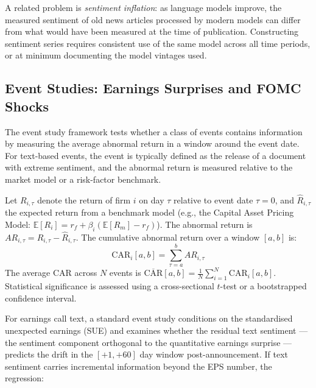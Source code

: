 A related problem is \emph{sentiment inflation}: as language models improve, the measured sentiment of old news articles processed by modern models can differ from what would have been measured at the time of publication. Constructing sentiment series requires consistent use of the same model across all time periods, or at minimum documenting the model vintages used.

\subsection{Event Studies: Earnings Surprises and FOMC Shocks}
\label{sec:ch09-event-studies}

The event study framework \cite{fama1970efficient} tests whether a class of events contains information by measuring the average abnormal return in a window around the event date. For text-based events, the event is typically defined as the release of a document with extreme sentiment, and the abnormal return is measured relative to the market model or a risk-factor benchmark.

\begin{definition}
\label{def:car}
Let $R_{i,\tau}$ denote the return of firm $i$ on day $\tau$ relative to event date $\tau=0$, and $\hat{R}_{i,\tau}$ the expected return from a benchmark model (e.g., the Capital Asset Pricing Model: $\mathbb{E}[R_i] = r_f + \beta_i(\mathbb{E}[R_m]-r_f)$). The abnormal return is $AR_{i,\tau} = R_{i,\tau} - \hat{R}_{i,\tau}$. The cumulative abnormal return over a window $[a,b]$ is:
\begin{equation}
  \label{eq:car}
  \mathrm{CAR}_{i}[a,b] = \sum_{\tau=a}^{b} AR_{i,\tau}
\end{equation}
The average CAR across $N$ events is $\overline{\mathrm{CAR}}[a,b] = \frac{1}{N} \sum_{i=1}^{N} \mathrm{CAR}_i[a,b]$. Statistical significance is assessed using a cross-sectional $t$-test or a bootstrapped confidence interval.
\end{definition}

For earnings call text, a standard event study conditions on the standardised unexpected earnings (SUE) and examines whether the residual text sentiment --- the sentiment component orthogonal to the quantitative earnings surprise --- predicts the drift in the $[+1, +60]$ day window post-announcement. If text sentiment carries incremental information beyond the EPS number, the regression:


